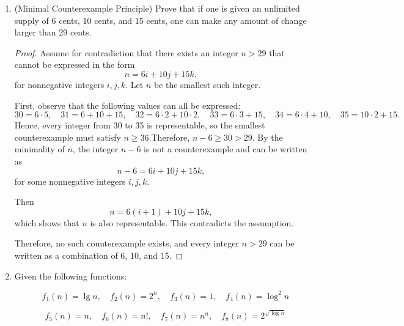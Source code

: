 \documentclass[12pt,a4paper]{article}
\theoremstyle{definition}
\begin{document}
\begin{enumerate}
    \item {\color{purple}(Minimal Counterexample Principle)}
    Prove that if one is given an unlimited supply of 6 cents, 10 cents, and 15 cents, one can make any amount of change larger than 29 cents.
    \begin{proof}
        Assume for contradiction that there exists an integer $n > 29$ that cannot be expressed in the form
        \[
        n = 6i + 10j + 15k,
        \]
        for nonnegative integers $i,j,k$. Let $n$ be the smallest such integer.
        
        First, observe that the following values can all be expressed:
        \[
        30 = 6\cdot5,\quad
        31 = 6 + 10 + 15,\quad
        32 = 6\cdot2 + 10\cdot2,\quad
        33 = 6\cdot3 + 15,\quad
        34 = 6\cdot4 + 10,\quad
        35 = 10\cdot2 + 15.
        \]
        Hence, every integer from 30 to 35 is representable, so the smallest counterexample must satisfy $n \ge 36$.Therefore, $n - 6 \ge 30 > 29$. By the minimality of $n$, the integer $n - 6$ is not a counterexample and can be written as
        \[
        n - 6 = 6i + 10j + 15k,
        \]
        for some nonnegative integers $i,j,k$.
        
        Then
        \[
        n = 6(i+1) + 10j + 15k,
        \]
        which shows that $n$ is also representable. This contradicts the assumption.
        
        Therefore, no such counterexample exists, and every integer $n > 29$ can be written as a combination of 6, 10, and 15.
    \end{proof}
        
    
    \smallskip
    \item {\color{purple}{(Complexity Class)}}  
    Given the following functions:
    
    \[
    \quad f_1(n) = \lg n, \quad f_2(n) = 2^n, \quad f_3(n) = 1, \quad f_4(n) = \log^2{n}
    \]
    
    \[
    \quad f_5(n) = n, \quad f_6(n) = n!, \quad f_7(n) = n^n, \quad f_8(n) = 2^{\sqrt{\log n}}
    \]



\end{enumerate}
\end{document}
